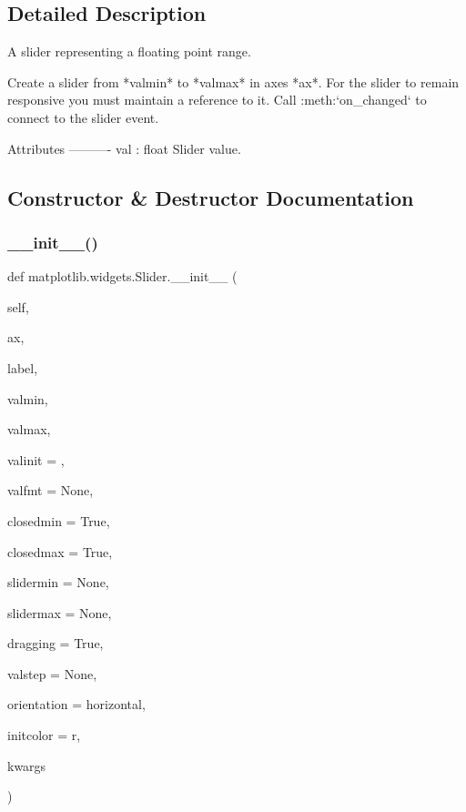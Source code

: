 \subsection{Detailed Description}
\begin{DoxyVerb}A slider representing a floating point range.

Create a slider from *valmin* to *valmax* in axes *ax*. For the slider to
remain responsive you must maintain a reference to it. Call
:meth:`on_changed` to connect to the slider event.

Attributes
----------
val : float
    Slider value.
\end{DoxyVerb}
 

\subsection{Constructor \& Destructor Documentation}
\mbox{\label{classmatplotlib_1_1widgets_1_1Slider_aefce2eab71139753f69bebc6a358b687}} 
\subsubsection{\texorpdfstring{\+\_\+\+\_\+init\+\_\+\+\_\+()}{\_\_init\_\_()}}
{\footnotesize\ttfamily def matplotlib.\+widgets.\+Slider.\+\_\+\+\_\+init\+\_\+\+\_\+ (\begin{DoxyParamCaption}\item[{}]{self,  }\item[{}]{ax,  }\item[{}]{label,  }\item[{}]{valmin,  }\item[{}]{valmax,  }\item[{}]{valinit = {},  }\item[{}]{valfmt = {\ttfamily None},  }\item[{}]{closedmin = {\ttfamily True},  }\item[{}]{closedmax = {\ttfamily True},  }\item[{}]{slidermin = {\ttfamily None},  }\item[{}]{slidermax = {\ttfamily None},  }\item[{}]{dragging = {\ttfamily True},  }\item[{}]{valstep = {\ttfamily None},  }\item[{}]{orientation = {\ttfamily \textquotesingle{}horizontal\textquotesingle{}},  }\item[{}]{initcolor = {\ttfamily \textquotesingle{}r\textquotesingle{}},  }\item[{}]{kwargs }\end{DoxyParamCaption})}

